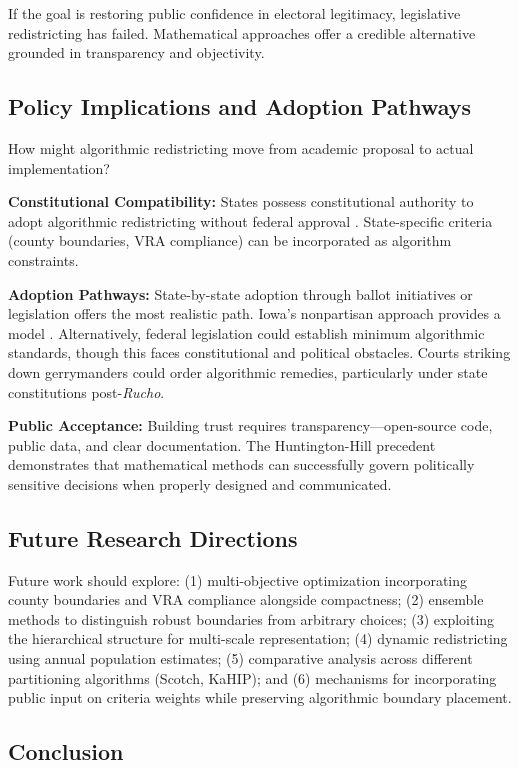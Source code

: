 If the goal is restoring public confidence in electoral legitimacy, legislative redistricting has failed. Mathematical approaches offer a credible alternative grounded in transparency and objectivity.
\subsection{Policy Implications and Adoption Pathways}

How might algorithmic redistricting move from academic proposal to actual implementation?

\textbf{Constitutional Compatibility:} States possess constitutional authority to adopt algorithmic redistricting without federal approval \cite{baker1962}. State-specific criteria (county boundaries, VRA compliance) can be incorporated as algorithm constraints.

\textbf{Adoption Pathways:} State-by-state adoption through ballot initiatives or legislation offers the most realistic path. Iowa's nonpartisan approach provides a model \cite{deford2019implementing}. Alternatively, federal legislation could establish minimum algorithmic standards, though this faces constitutional and political obstacles. Courts striking down gerrymanders could order algorithmic remedies, particularly under state constitutions post-\textit{Rucho}.

\textbf{Public Acceptance:} Building trust requires transparency—open-source code, public data, and clear documentation. The Huntington-Hill precedent demonstrates that mathematical methods can successfully govern politically sensitive decisions when properly designed and communicated.
\subsection{Future Research Directions}

Future work should explore: (1) multi-objective optimization incorporating county boundaries and VRA compliance alongside compactness; (2) ensemble methods \cite{fifield2020automated} to distinguish robust boundaries from arbitrary choices; (3) exploiting the hierarchical structure for multi-scale representation; (4) dynamic redistricting using annual population estimates; (5) comparative analysis across different partitioning algorithms (Scotch, KaHIP); and (6) mechanisms for incorporating public input on criteria weights while preserving algorithmic boundary placement.
\subsection{Conclusion}

